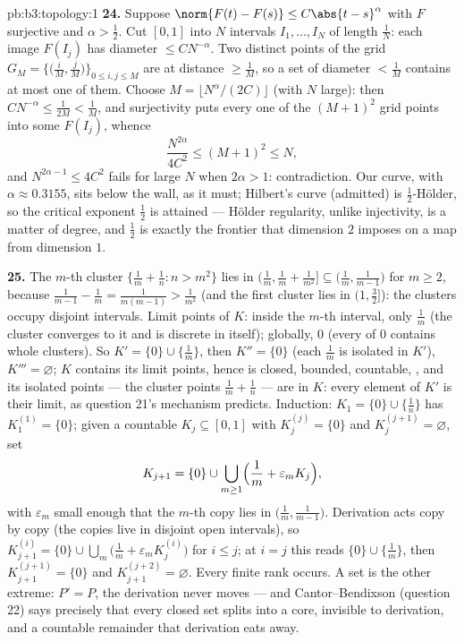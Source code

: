 \begin{solution}{pb:b3:topology:1}
\textbf{24.} Suppose $\norm{F(t) - F(s)} \leq
C\abs{t-s}^\alpha$ with $F$ surjective and $\alpha >
\frac12$. Cut $[0,1]$ into $N$ intervals $I_1, \dots, I_N$ of
length $\frac1N$: each image $F(I_j)$ has diameter $\leq
CN^{-\alpha}$. Two distinct points of the grid $G_M =
\bigl\{\bigl(\frac iM, \frac jM\bigr)\bigr\}_{0 \leq i, j
\leq M}$ are at distance $\geq \frac1M$, so a set of diameter
$< \frac1M$ contains at most one of them. Choose $M =
\lfloor N^\alpha/(2C)\rfloor$ (with $N$ large): then
$CN^{-\alpha} \leq \frac1{2M} < \frac1M$, and surjectivity
puts every one of the $(M+1)^2$ grid points into some
$F(I_j)$, whence
\[
\frac{N^{2\alpha}}{4C^2} \leq (M + 1)^2 \leq N,
\]
and $N^{2\alpha - 1} \leq 4C^2$ fails for large $N$ when
$2\alpha > 1$: contradiction. Our curve, with $\alpha \approx
0.3155$, sits below the wall, as it must; Hilbert's curve
(admitted) is $\frac12$-H\"older, so the critical exponent
$\frac12$ is attained --- H\"older regularity, unlike
injectivity, is a matter of degree, and $\frac12$ is exactly
the frontier that dimension $2$ imposes on a map from
dimension $1$.

\textbf{25.} The $m$-th cluster $\{\frac1m + \frac1n : n >
m^2\}$ lies in $\bigl(\frac1m, \frac1m + \frac1{m^2}\bigr]
\subseteq \bigl(\frac1m, \frac1{m-1}\bigr)$ for $m \geq 2$,
because $\frac1{m-1} - \frac1m = \frac1{m(m-1)} >
\frac1{m^2}$ (and the first cluster lies in $(1, \frac32]$):
the clusters occupy disjoint intervals. Limit points of $K$:
inside the $m$-th interval, only $\frac1m$ (the cluster
converges to it and is discrete in itself); globally, $0$
(every  of $0$ contains whole clusters). So $K'
= \{0\} \cup \{\frac1m\}$, then $K'' = \{0\}$ (each $\frac1m$
is isolated in $K'$), $K''' = \varnothing$; $K$ contains its
limit points, hence is closed, bounded, countable, ,
and its isolated points --- the cluster points $\frac1m +
\frac1n$ --- are  in $K$: every element of $K'$ is
their limit, as question 21's mechanism predicts. Induction:
$K_1 = \{0\}\cup\{\frac1n\}$ has $K_1^{(1)} = \{0\}$; given
a countable  $K_j \subseteq [0, 1]$ with $K_j^{(j)} =
\{0\}$ and $K_j^{(j+1)} = \varnothing$, set
\[
K_{j+1} = \{0\} \cup \bigcup_{m \geq 1}
\Bigl(\frac1m + \varepsilon_m K_j\Bigr),
\]
with $\varepsilon_m$ small enough that the $m$-th copy lies
in $\bigl(\frac1m, \frac1{m-1}\bigr)$. Derivation acts copy
by copy (the copies live in disjoint open intervals), so
$K_{j+1}^{(i)} = \{0\} \cup \bigcup_m\bigl(\frac1m +
\varepsilon_mK_j^{(i)}\bigr)$ for $i \leq j$; at $i = j$ this
reads $\{0\} \cup \{\frac1m\}$, then $K_{j+1}^{(j+1)} =
\{0\}$ and $K_{j+1}^{(j+2)} = \varnothing$. Every finite rank
occurs. A  set is the other extreme: $P' = P$, the
derivation never moves --- and Cantor--Bendixson (question
22) says precisely that every closed set splits into a
 core, invisible to derivation, and a countable
remainder that derivation eats away.
\end{solution}
